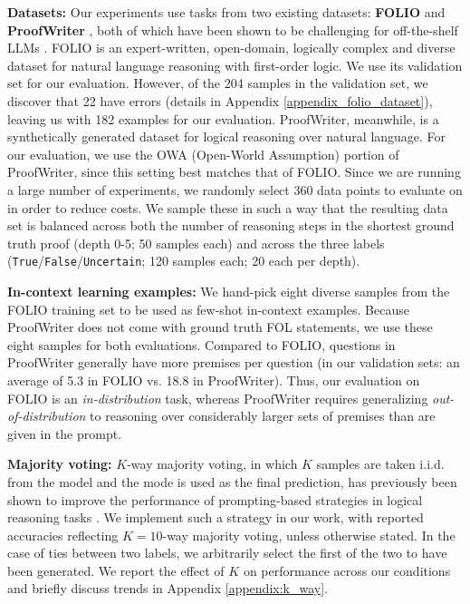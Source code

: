 \documentclass[11pt]{article}
\begin{document}
\textbf{Datasets:} Our experiments use tasks from two existing datasets: \textbf{FOLIO} \cite{han2022folio} and \textbf{ProofWriter} \cite{tafjord2021proofwriter}, both of which have been shown to be challenging for off-the-shelf LLMs \cite{han2022folio, creswell2023selection}. FOLIO is an expert-written, open-domain, logically complex and diverse dataset for natural language reasoning with first-order logic. We use its validation set for our evaluation. However, of the 204 samples in the validation set, we discover that 22 have errors (details in Appendix \ref{appendix_folio_dataset}), leaving us with 182 examples for our evaluation. ProofWriter, meanwhile, is a synthetically generated dataset for logical reasoning over natural language. For our evaluation, we use the OWA (Open-World Assumption) portion of ProofWriter, since this setting best matches that of FOLIO. Since we are running a large number of experiments, we randomly select 360 data points to evaluate on in order to reduce costs. We sample these in such a way that the resulting data set is balanced across both the number of reasoning steps in the shortest ground truth proof (depth 0-5; 50 samples each) and across the three labels (\texttt{True}/\texttt{False}/\texttt{Uncertain}; 120 samples each; 20 each per depth).

\textbf{In-context learning examples:} We hand-pick eight diverse samples from the FOLIO training set to be used as few-shot in-context examples. Because ProofWriter does not come with ground truth FOL statements, we use these eight samples for both evaluations. Compared to FOLIO, questions in ProofWriter generally have more premises per question (in our validation sets: an average of 5.3 in FOLIO vs. 18.8 in ProofWriter).
Thus, our evaluation on FOLIO is an \emph{in-distribution} task, whereas ProofWriter requires generalizing \emph{out-of-distribution} to reasoning over considerably larger sets of premises than are given in the prompt.

\textbf{Majority voting:} $K$-way majority voting, in which $K$ samples are taken i.i.d. from the model and the mode is used as the final prediction, has previously been shown to improve the performance of prompting-based strategies in logical reasoning tasks \cite{wang2023self}.
We implement such a strategy in our work, with reported accuracies reflecting $K{=}10$-way majority voting, unless otherwise stated.
In the case of ties between two labels, we arbitrarily select the first of the two to have been generated.
We report the effect of $K$ on performance across our conditions and briefly discuss trends in Appendix \ref{appendix:k_way}.
\end{document}
